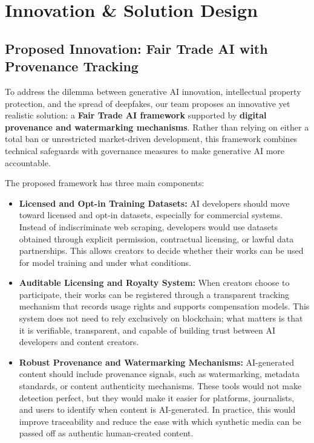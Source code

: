 \section{Innovation \& Solution Design}\label{sec:solution-design}

\subsection{Proposed Innovation: Fair Trade AI with Provenance Tracking}\label{sec:fair-trade-ai}
To address the dilemma between generative AI innovation, intellectual property protection, and the spread of deepfakes, our team proposes an innovative yet realistic solution: a \textbf{Fair Trade AI framework} supported by \textbf{digital provenance and watermarking mechanisms}. Rather than relying on either a total ban or unrestricted market-driven development, this framework combines technical safeguards with governance measures to make generative AI more accountable.

The proposed framework has three main components:
\begin{itemize}
    \item \textbf{Licensed and Opt-in Training Datasets:} AI developers should move toward licensed and opt-in datasets, especially for commercial systems. Instead of indiscriminate web scraping, developers would use datasets obtained through explicit permission, contractual licensing, or lawful data partnerships. This allows creators to decide whether their works can be used for model training and under what conditions.

    \item \textbf{Auditable Licensing and Royalty System:} When creators choose to participate, their works can be registered through a transparent tracking mechanism that records usage rights and supports compensation models. This system does not need to rely exclusively on blockchain; what matters is that it is verifiable, transparent, and capable of building trust between AI developers and content creators.

    \item \textbf{Robust Provenance and Watermarking Mechanisms:} AI-generated content should include provenance signals, such as watermarking, metadata standards, or content authenticity mechanisms. These tools would not make detection perfect, but they would make it easier for platforms, journalists, and users to identify when content is AI-generated. In practice, this would improve traceability and reduce the ease with which synthetic media can be passed off as authentic human-created content.
\end{itemize}

